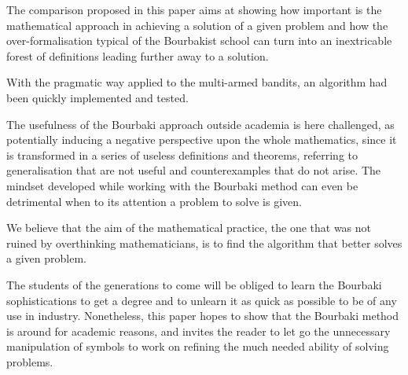 \documentclass[]{scrartcl}
\theoremstyle{definition}
\begin{document}
The comparison proposed in this paper aims at showing how important is the mathematical approach in achieving a solution of a given problem and how the over-formalisation typical of the Bourbakist school can turn into an inextricable forest of definitions leading further away to a solution.

With the pragmatic way applied to the multi-armed bandits, an algorithm had been quickly implemented and tested.

The usefulness of the Bourbaki approach outside academia is here challenged, as potentially inducing a negative perspective upon the whole mathematics, since it is transformed in a series of useless definitions and theorems, referring to generalisation that are not useful and counterexamples that do not arise. The mindset developed while working with the Bourbaki method can even be detrimental when to its attention a problem to solve is given.

We believe that the aim of the mathematical practice, the one that was not ruined by overthinking mathematicians, is to find the algorithm that better solves a given problem. 

The students of the generations to come will be obliged to learn the Bourbaki sophistications to get a degree and to unlearn it as quick as possible to be of any use in industry. Nonetheless, this paper hopes to show that the Bourbaki method is around for academic reasons, and invites the reader to let go the unnecessary manipulation of symbols to work on refining the much needed ability of solving problems.

 

\end{document}
